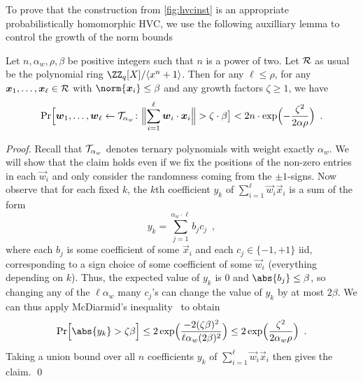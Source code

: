 To prove that the construction from \autoref{fig:hvcinst} is an appropriate probabilistically homomorphic HVC, we use the following auxilliary lemma to control the growth of the norm bounds
\begin{lemma}\label{lem:normgrowth}
Let $n, \alpha_w, \rho, \beta$ be positive integers such that $n$ is a power of two.
Let $\mathcal{R}$ as usual be the polynomial ring $\ZZ_q[X]/\langle x^n+1\rangle$.
Then for any $\ell\leq \rho$, for any $\boldsymbol{x}_1,\ldots,\boldsymbol{x}_\ell\in \mathcal{R}$ with $\norm{\vec{x}_i}\leq \beta$ and any growth factors $\zeta \geq 1$, we have
\[
 \Pr\Bigl[\vec{w}_1,\ldots,\vec{w}_\ell \gets \tern_{\alpha_w}\colon \Bigl\|\smashoperator{\sum_{i=1}^{\ell}} \vec{w}_i\cdot \vec{x}_i\Bigr\| > \zeta\cdot \beta \bigr] < 2n\cdot \exp\Bigl(-\frac{\zeta^2}{2\alpha\rho}\Bigr)\enspace.
\]
\end{lemma}
\begin{proof}
Recall that $\mathcal{T}_{\alpha_w}$ denotes ternary polynomials with weight exactly $\alpha_w$. We will show that the claim holds even if we fix the positions of the non-zero entries in each $\vec{w}_i$ and only consider the randomness coming from the $\pm 1$-signs.
Now observe that for each fixed $k$, the $k$th coefficient $y_k$ of $\sum_{i=1}^{\ell} \vec{w}_i \vec{x}_i$ is a sum of the form
\[
 y_k = \sum_{j=1}^{\alpha_w\cdot \ell} b_j c_j\enspace,
\]
where each $b_j$ is some coefficient of some $\vec{x}_i$ and each $c_j\in\{-1,+1\}$ iid, corresponding to a sign choice of some coefficient of some $\vec{w}_i$ (everything depending on $k$).
Thus, the expected value of $y_k$ is 0 and $\abs{b_j}\leq \beta$, so changing any of the $\ell\alpha_w$ many $c_j$'s can change the value of $y_k$ by at most $2\beta$.
We can thus apply McDiarmid's inequality~\cite{McDiarmid89} to obtain
\[
 \Pr\Bigl[\abs{y_k} > \zeta\beta\Bigr] \leq 2\exp\Bigl(\frac{-2(\zeta\beta)^2}{\ell\alpha_w(2\beta)^2}\Bigr) \leq 2\exp\Bigl(\frac{\zeta^2}{2\alpha_w\rho} \Bigr)\enspace.
\]
Taking a union bound over all $n$ coefficients $y_k$ of $\sum_{i=1}^{\ell} \vec{w}_i \vec{x}_i$ then gives the claim.
\qed
\end{proof}


